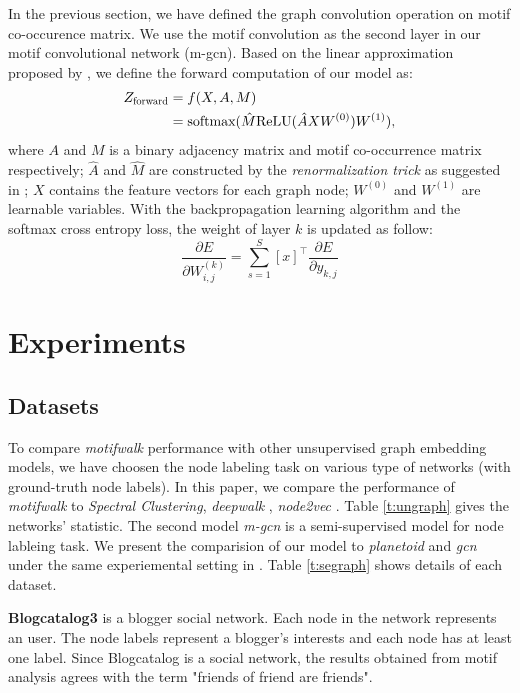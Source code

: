 \documentclass{article}
\theoremstyle{definition}
\begin{document}
In the previous section, we have defined the graph convolution
operation on motif co-occurence matrix. We use the motif convolution
as the second layer in our motif convolutional network (m-gcn). Based on the 
linear approximation proposed by \citeauthor{gcn}, we define the forward
computation of our model as:
\begin{equation} \label{eq:2}
    \begin{aligned}
    Z_{\scalebox{0.75}{forward}} &= f(X,A,M) \\
    &= \mbox{softmax}(\hat{M} \mbox{ReLU}(\hat{A}XW^{(0)})W^{(1)}),
    \end{aligned}
\end{equation}
where $A$ and $M$ is a binary adjacency matrix and motif co-occurrence
matrix respectively; $\hat{A}$ and $\hat{M}$ are constructed by the
\emph{renormalization trick} as suggested in \cite{gcn}; $X$ contains
the feature vectors for each graph node; $W^{(0)}$ and $W^{(1)}$ are
learnable variables. With the backpropagation learning algorithm and the
softmax cross entropy loss, the weight of layer $k$ is updated as follow: 
\begin{equation}
\label{eq:3}
\frac{\partial E}{\partial W^{(k)}_{i,j}} = \sum^S_{s=1} [x]^\top \frac{\partial E}{\partial y_{k,j}}
\end{equation}

\section{Experiments}

\subsection{Datasets}

To compare \emph{motifwalk} performance with other unsupervised graph
embedding models, we have choosen the node labeling task on various
type of networks (with ground-truth node labels). In this paper, we
compare the performance of \emph{motifwalk} to \emph{Spectral Clustering}, 
\emph{deepwalk} \cite{deepwalk}, \emph{node2vec} \cite{node2vec}. Table \ref{t:ungraph}
gives the networks' statistic. The second model \emph{m-gcn} is a semi-supervised model for node
lableing task. We present the comparision of our model to \emph{planetoid} and
\emph{gcn} under the same experiemental setting in \cite{gcn}. Table \ref{t:segraph}
shows details of each dataset.

\textbf{Blogcatalog3} \cite{blogcatalog} is a blogger social network. Each node
in the network represents an user. The node labels represent a blogger's interests and
each node has at least one label. Since Blogcatalog is a social network, the results
obtained from motif analysis agrees with the term "friends of friend are friends".
\end{document}
